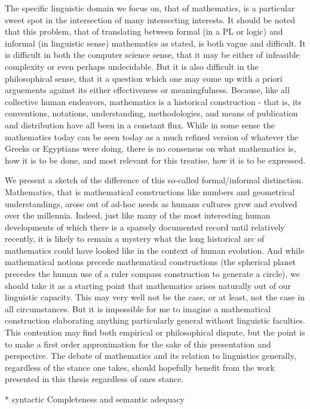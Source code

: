 The specific linguistic domain we focus on, that of mathematics, is a particular
sweet spot in the intersection of many intersecting interests. It should be
noted that this problem, that of translating between formal (in a PL or logic)
and informal (in linguistic sense) mathematics as stated, is both vague and
difficult. It is difficult in both the computer science sense, that it may be
either of infeasible complexity or even perhaps undecidable. But it is also
difficult in the philosophical sense, that it a question which one may come up
with a priori arguements against its either effectiveness or meaningfulness.
Because, like all collective human endeavors, mathematics is a historical
construction - that is, its conventions, notations, understanding,
methodologies, and means of publication and distribution have all been in a
constant flux. While in some sense the mathematics today can be seen today as a
much refined version of whatever the Greeks or Egyptians were doing, there is no
consensus on what mathematics is, how it is to be done, and most relevant for
this treatise, how it is to be expressed.

We present a sketch of the difference of this so-called formal/informal
distinction. Mathematics, that is mathematical constructions like numbers and
geometrical understandings, arose out of ad-hoc needs as humans cultures grew
and evolved over the millennia. Indeed, just like many of the most interesting
human developments of which there is a sparsely documented record until
relatively recently, it is likely to remain a mystery what the long historical
arc of mathematics could have looked like in the context of human evolution. And
while mathematical notions precede mathematical constructions (the spherical
planet precedes the human use of a ruler compass construction to generate a
circle), we should take it as a starting point that mathematics arises naturally
out of our linguistic capacity. This may very well not be the case, or at least,
not the case in all circumstances. But it is impossible for me to imagine a
mathematical construction elaborating anything particularly general without
linguistic faculties. This contention may find both empirical or philosophical
dispute, but the point is to make a first order approximation for the sake of
this presentation and perspective. The debate of mathematics and its relation to
linguistics generally, regardless of the stance one takes, should hopefully
benefit from the work presented in this thesis regardless of ones stance.

  * syntactic Completeness and semantic adequacy

